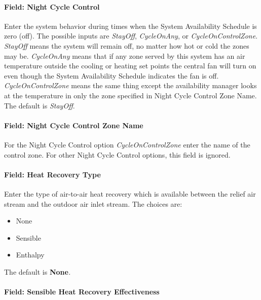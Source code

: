 \paragraph{Field: Night Cycle Control}\label{field-night-cycle-control}

Enter the system behavior during times when the System Availability Schedule is zero (off). The possible inputs are \emph{StayOff}, \emph{CycleOnAny}, or \emph{CycleOnControlZone}. \emph{StayOff} means the system will remain off, no matter how hot or cold the zones may be. \emph{CycleOnAny} means that if any zone served by this system has an air temperature outside the cooling or heating set points the central fan will turn on even though the System Availability Schedule indicates the fan is off. \emph{CycleOnControlZone} means the same thing except the availability manager looks at the temperature in only the zone specified in Night Cycle Control Zone Name. The default is \emph{StayOff}.

\paragraph{Field: Night Cycle Control Zone Name}\label{field-night-cycle-control-zone-name}

For the Night Cycle Control option \emph{CycleOnControlZone} enter the name of the control zone. For other Night Cycle Control options, this field is ignored.

\paragraph{Field: Heat Recovery Type}\label{field-heat-recovery-type-1}

Enter the type of air-to-air heat recovery which is available between the relief air stream and the outdoor air inlet stream. The choices are:

\begin{itemize}
\item
  None
\item
  Sensible
\item
  Enthalpy
\end{itemize}

The default is \textbf{None}\emph{.}

\paragraph{Field: Sensible Heat Recovery Effectiveness}\label{field-sensible-heat-recovery-effectiveness-1}

